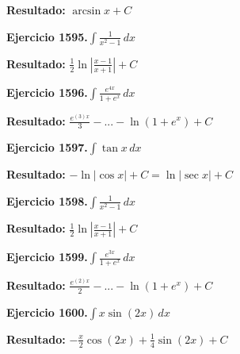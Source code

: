 \documentclass[10pt,a4paper]{article}
\begin{document}
\begin{solbox}
\textbf{Resultado:} \(\displaystyle \arcsin x + C\)
\end{solbox}

\begin{ejbox}
\textbf{Ejercicio 1595.}\quad $\int \frac{1}{x^2-1}\,dx$
\end{ejbox}

\begin{solbox}
\textbf{Resultado:} \(\displaystyle \frac{1}{2}\ln\left|\frac{x-1}{x+1}\right| + C\)
\end{solbox}

\begin{ejbox}
\textbf{Ejercicio 1596.}\quad $\int \frac{e^{4x}}{1+e^{x}}\,dx$
\end{ejbox}

\begin{solbox}
\textbf{Resultado:} \(\displaystyle \frac{e^{(3)x}}{3} - ... - \ln(1+e^x) + C\)
\end{solbox}

\newpage
\begin{ejbox}
\textbf{Ejercicio 1597.}\quad $\int \tan x\,dx$
\end{ejbox}

\begin{solbox}
\textbf{Resultado:} \(\displaystyle -\ln|\cos x| + C = \ln|\sec x| + C\)
\end{solbox}

\begin{ejbox}
\textbf{Ejercicio 1598.}\quad $\int \frac{1}{x^2-1}\,dx$
\end{ejbox}

\begin{solbox}
\textbf{Resultado:} \(\displaystyle \frac{1}{2}\ln\left|\frac{x-1}{x+1}\right| + C\)
\end{solbox}

\begin{ejbox}
\textbf{Ejercicio 1599.}\quad $\int \frac{e^{3x}}{1+e^{x}}\,dx$
\end{ejbox}

\begin{solbox}
\textbf{Resultado:} \(\displaystyle \frac{e^{(2)x}}{2} - ... - \ln(1+e^x) + C\)
\end{solbox}

\newpage
\begin{ejbox}
\textbf{Ejercicio 1600.}\quad $\int x \sin(2x)\,dx$
\end{ejbox}

\begin{solbox}
\textbf{Resultado:} \(\displaystyle -\frac{x}{2}\cos(2x) + \frac{1}{4}\sin(2x) + C\)
\end{solbox}
\end{document}
